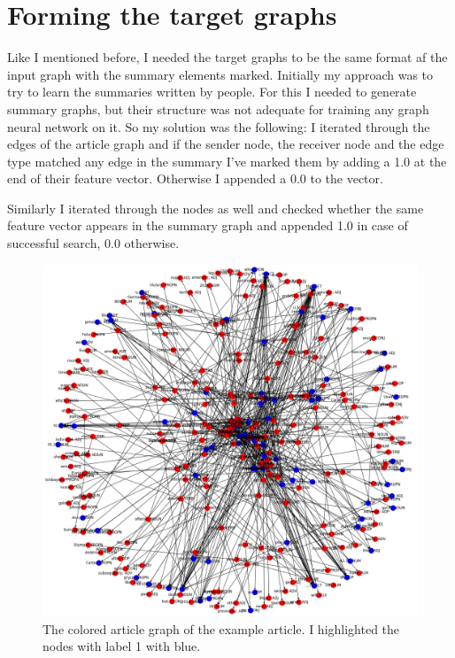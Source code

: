 \FloatBarrier
\section{Forming the target graphs}
Like I mentioned before, I needed the target graphs to be the same format af the input graph with the summary elements marked. Initially my approach was to try to learn the summaries written by people. For this I needed to generate summary graphs, but their structure was not adequate for training any graph neural network on it. So my solution was the following: I iterated through the edges of the article graph and if the sender node, the receiver node and the edge type matched any edge in the summary I've marked them by adding a 1.0 at the end of their feature vector. Otherwise I appended a 0.0 to the vector.

Similarly I iterated through the nodes as well and checked whether the same feature vector appears in the summary graph and appended 1.0 in case of successful search, 0.0 otherwise.

\begin{figure}[!ht]
	\centering
	\includegraphics[width=150mm, keepaspectratio]{figures/usain_bolt_colored.png}
	\caption{The colored article graph of the example article. I highlighted the nodes with label 1 with blue.}
	\label{fig:usain_article_graph_colored}
\end{figure}

